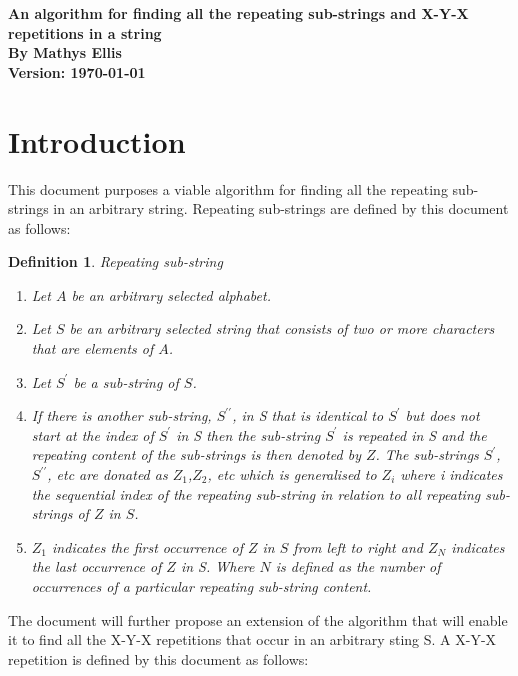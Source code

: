 \documentclass[12pt]{article}
\newtheorem{defn}{Definition}[section]
\begin{document}
\begin{center}

	
	\null
	\vspace{2in}
	\LARGE\textbf{An algorithm for finding all the repeating sub-strings and X-Y-X repetitions in a string}
	\\
	\vspace{0.5in}
	\large \textbf{By Mathys Ellis}
	\\
	\vspace{0.5in}
	\large \textbf{Version: \today}
\end{center}

\newpage
\tableofcontents
\newpage
\section{Introduction}
\begin{flushleft}
	This document purposes a viable algorithm for finding all the repeating sub-strings in an arbitrary string. Repeating sub-strings are defined by this document as follows:\\
	\begin{defn}
	    Repeating sub-string   
		\begin{enumerate}
			\item Let $A$ be an arbitrary selected alphabet.
			\item Let $S$ be an arbitrary selected string that consists of two or more characters that are elements of $A$.
			\item Let  $S^{\prime}$ be a sub-string of $S$.
			\item If there is another sub-string,  $S^{\prime\prime}$, in S that is identical to  $S^{\prime}$ but does not start at the index of  $S^{\prime}$ in S then the sub-string  $S^{\prime}$ is repeated in S and the repeating content of the sub-strings is then denoted by $Z$. The sub-strings $S^{\prime}$, $S^{\prime\prime}$, etc are donated as $Z_{1}$,$Z_{2}$, etc which is generalised to $Z_{i}$ where i indicates the sequential index of the repeating sub-string in relation to all repeating sub-strings of $Z$ in $S$.
			\item $Z_{1}$ indicates the first occurrence of $Z$ in $S$ from left to right and $Z_{N}$ indicates the last occurrence of $Z$ in S. Where $N$ is defined as the number of occurrences of a particular repeating sub-string content.  
		\end{enumerate}
	\end{defn}
	The document will further propose an extension of the algorithm that will enable it to find all the X-Y-X repetitions that occur in an arbitrary sting S. A X-Y-X repetition is defined by this document as follows:   

\end{flushleft}
\end{document}
